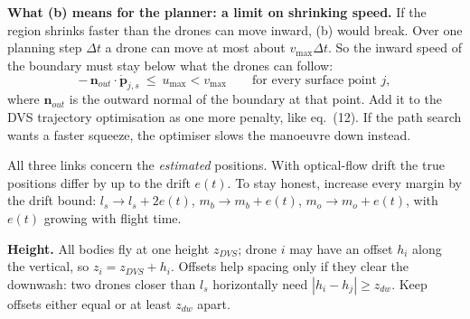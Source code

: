 \documentclass[11pt,a4paper]{article}
\newcommand{\vect}[1]{\mathbf{#1}}
\begin{document}
\textbf{What (b) means for the planner: a limit on shrinking speed.} If the region shrinks faster than the drones can
move inward, (b) would break. Over one planning step $\Delta t$ a drone can move at most about $v_{\max}\Delta t$. So the
inward speed of the boundary must stay below what the drones can follow:
\[
-\,\vect{n}_{out}\cdot\dot{\vect{p}}_{j,s}\ \le\ u_{\max}<v_{\max}\qquad\text{for every surface point }j,
\]
where $\vect{n}_{out}$ is the outward normal of the boundary at that point. Add it to the DVS trajectory optimisation as
one more penalty, like eq.~(12). If the path search wants a faster squeeze, the optimiser slows the manoeuvre down
instead.

\begin{watchbox}
All three links concern the \emph{estimated} positions. With optical-flow drift the true positions differ by up to the
drift $e(t)$. To stay honest, increase every margin by the drift bound: $l_s\to l_s+2e(t)$, $m_b\to m_b+e(t)$,
$m_o\to m_o+e(t)$, with $e(t)$ growing with flight time.
\end{watchbox}

\textbf{Height.} All bodies fly at one height $z_{DVS}$; drone $i$ may have an offset $h_i$ along the vertical, so
$z_i=z_{DVS}+h_i$. Offsets help spacing only if they clear the downwash: two drones closer than $l_s$ horizontally need
$|h_i-h_j|\ge z_{dw}$. Keep offsets either equal or at least $z_{dw}$ apart.

\end{document}
